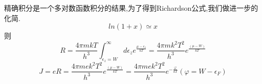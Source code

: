 \documentclass[10pt, a4paper]{article}
\begin{document}
	精确积分是一个多对数函数积分的结果,为了得到Richardson公式,我们做进一步的化简.\\
	\[ln(1+x)\simeq x\]
	则\[R = \frac{4\pi mkT}{h^3}\int_{\epsilon_z=W}^{\infty}d\epsilon_ze^{\frac{\mu-\epsilon_z}{kT}}=\frac{4\pi mk^2T^2}{h^3}e^{\frac{(\mu-W)}{kT}}\]
	\[J = eR = \frac{4\pi mek^2T^2}{h^3}e^{\frac{(\mu-W)}{kT}}=\frac{4\pi mek^2T^2}{h^3}e^{-\frac{\varphi}{kT}}(\varphi=W-\epsilon_F)\]
	
	
\end{document}
